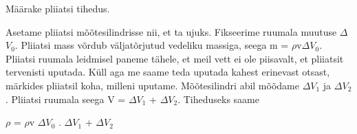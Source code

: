
Määrake pliiatsi tihedus.

\hint

\solu
Asetame pliiatsi mõõtesilindrisse nii, et ta ujuks. Fikseerime ruumala muutuse $\Delta$$V_0$. Pliiatsi mass võrdub väljatõrjutud vedeliku massiga, seega m = $\rho$v$\Delta$$V_0$. Pliiatsi ruumala leidmisel paneme tähele, et meil vett ei ole piisavalt, et pliiatsit tervenisti uputada. Küll aga me saame teda uputada kahest erinevast otsast, märkides pliiatsil koha, milleni uputame. Mõõtesilindri abil mõõdame $\Delta$$V_1$ ja $\Delta$$V_2$. Pliiatsi ruumala seega V = $\Delta$$V_1$ + $\Delta$$V_2$. Tiheduseks saame

$\rho$ = $\rho$v $\Delta$$V_0$ . $\Delta$$V_1$ + $\Delta$$V_2$
\probend
